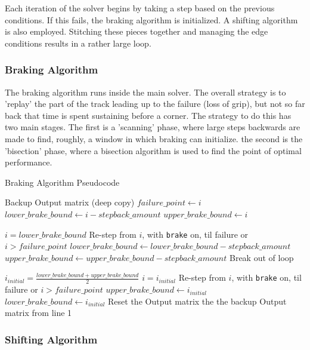 \documentclass{article}
\begin{document}
Each iteration of the solver begins by taking a step based on the previous conditions. If this fails, the braking algorithm is initialized. A shifting algorithm is also employed. Stitching these pieces together and managing the edge conditions results in a rather large loop.

\subsubsection{Braking Algorithm}
The braking algorithm runs inside the main solver. The overall strategy is to 'replay' the part of the track leading up to the failure (loss of grip), but not so far back that time is spent sustaining before a corner. The strategy to do this has two main stages. The first is a 'scanning' phase, where large steps backwards are made to find, roughly, a window in which braking can initialize. the second is the 'bisection' phase, where a bisection algorithm is used to find the point of optimal performance.

\begin{algorithm}[H]
\caption{Braking Algorithm Pseudocode}
\begin{algorithmic}[1]
	\State Backup Output matrix (deep copy)
	\State $failure\_point \gets i$
	\State $lower\_brake\_bound \gets i-stepback\_amount$
	\State $upper\_brake\_bound \gets i$
	
		\State $i = lower\_brake\_bound$
		\State Re-step from $i$, with \texttt{brake} on, til failure or $i > failure\_point$
			\State $lower\_brake\_bound \gets lower\_brake\_bound - stepback\_amount$
			\State $upper\_brake\_bound \gets upper\_brake\_bound - stepback\_amount$
		\Else
			\State Break out of loop
		\EndIf
	\EndWhile
	
		\State $i_{initial} = \frac{lower\_brake\_bound + upper\_brake\_bound}{2}$
		\State $i = i_{initial}$
		\State Re-step from $i$, with \texttt{brake} on, til failure or $i > failure\_point$
			\State $upper\_brake\_bound \gets i_{initial}$
		\Else
			\State $lower\_brake\_bound \gets i_{initial}$
		\EndIf
		\State Reset the Output matrix the the backup Output matrix from line 1
	\EndWhile
	
\end{algorithmic}
\end{algorithm}

\subsubsection{Shifting Algorithm}
\end{document}
